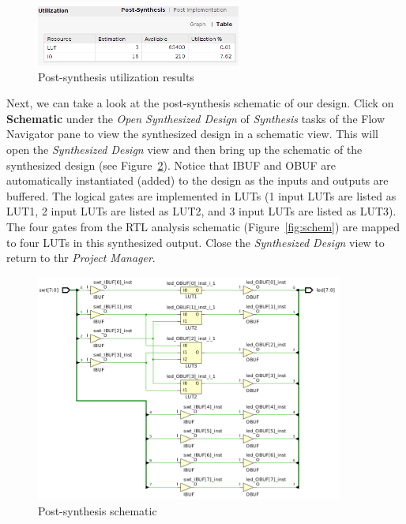 \documentclass[11pt]{article}
\begin{document}
\begin{figure}[!h]
    \centering
    \includegraphics[width=0.6\textwidth]{images/util.png}
    \caption{Post-synthesis utilization results}
    \label{fig:util}
\end{figure}

Next, we can take a look at the post-synthesis schematic of our design. Click on \textbf{Schematic} under the \textit{Open Synthesized Design} of \textit{Synthesis} tasks of the Flow Navigator pane to view the synthesized design in a schematic view. This will open the \textit{Synthesized Design} view and then bring up the schematic of the synthesized design (see Figure~\ref{fig:schem2}). Notice that IBUF and OBUF are automatically instantiated (added) to the design as the inputs and outputs are buffered. The logical gates are implemented in LUTs (1 input LUTs are listed as LUT1, 2 input LUTs are listed as LUT2, and 3 input LUTs are listed as LUT3). The four gates from the RTL analysis schematic (Figure~\ref{fig:schem}) are mapped to four LUTs in this synthesized output. Close the \textit{Synthesized Design} view to return to thr \textit{Project Manager}.
\newpage

\begin{figure}[!h]
    \centering
    \includegraphics[width=0.9\textwidth]{images/schem_post_syn.png}
    \caption{Post-synthesis schematic}
    \label{fig:schem2}
\end{figure}
\end{document}
